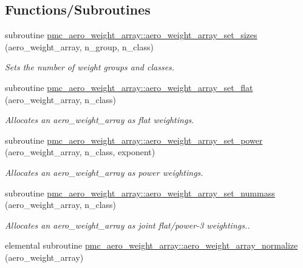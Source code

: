 \subsection*{Functions/\+Subroutines}
\begin{DoxyCompactItemize}
\item 
subroutine \mbox{\hyperlink{namespacepmc__aero__weight__array_ae550d4421da58c4fa79291f274881c13}{pmc\+\_\+aero\+\_\+weight\+\_\+array\+::aero\+\_\+weight\+\_\+array\+\_\+set\+\_\+sizes}} (aero\+\_\+weight\+\_\+array, n\+\_\+group, n\+\_\+class)
\begin{DoxyCompactList}\small\item\em Sets the number of weight groups and classes. \end{DoxyCompactList}\item 
subroutine \mbox{\hyperlink{namespacepmc__aero__weight__array_a4886dd503446783dd264db9c8986d38f}{pmc\+\_\+aero\+\_\+weight\+\_\+array\+::aero\+\_\+weight\+\_\+array\+\_\+set\+\_\+flat}} (aero\+\_\+weight\+\_\+array, n\+\_\+class)
\begin{DoxyCompactList}\small\item\em Allocates an {\ttfamily aero\+\_\+weight\+\_\+array} as flat weightings. \end{DoxyCompactList}\item 
subroutine \mbox{\hyperlink{namespacepmc__aero__weight__array_acee7592ccd5029f699596be244cbef2e}{pmc\+\_\+aero\+\_\+weight\+\_\+array\+::aero\+\_\+weight\+\_\+array\+\_\+set\+\_\+power}} (aero\+\_\+weight\+\_\+array, n\+\_\+class, exponent)
\begin{DoxyCompactList}\small\item\em Allocates an {\ttfamily aero\+\_\+weight\+\_\+array} as power weightings. \end{DoxyCompactList}\item 
subroutine \mbox{\hyperlink{namespacepmc__aero__weight__array_a98611587acf3064873a39d6cd128d4c8}{pmc\+\_\+aero\+\_\+weight\+\_\+array\+::aero\+\_\+weight\+\_\+array\+\_\+set\+\_\+nummass}} (aero\+\_\+weight\+\_\+array, n\+\_\+class)
\begin{DoxyCompactList}\small\item\em Allocates an {\ttfamily aero\+\_\+weight\+\_\+array} as joint flat/power-\/3 weightings.. \end{DoxyCompactList}\item 
elemental subroutine \mbox{\hyperlink{namespacepmc__aero__weight__array_a4faf647ac7900cdcac273e4167e8e088}{pmc\+\_\+aero\+\_\+weight\+\_\+array\+::aero\+\_\+weight\+\_\+array\+\_\+normalize}} (aero\+\_\+weight\+\_\+array)

\end{DoxyCompactItemize}
